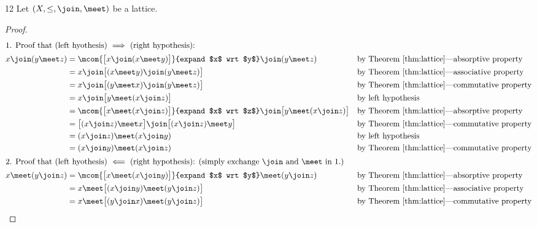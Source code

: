 \begin{theorem}
\label{thm:lat_dis}
\citep{burris}{12}
Let $(X,\le,\join,\meet)$ be a lattice.
\end{theorem}
\begin{proof}
\begin{align*}
\intertext{1. Proof that (left hyothesis) $\implies$   (right hypothesis):}
  x \join (y \meet z)
    &= \mcom{\big[ x \join (x\meet y)\big]}{expand $x$ wrt $y$} \join (y \meet z)
    && \text{by Theorem~\ref{thm:lattice}---absorptive property}
  \\&= x \join \big[ (x\meet y) \join (y \meet z) \big]
    && \text{by Theorem~\ref{thm:lattice}---associative property}
  \\&= x \join \big[ (y\meet x) \join (y \meet z) \big]
    && \text{by Theorem~\ref{thm:lattice}---commutative property}
  \\&= x \join \big[ y\meet(x \join z) \big]
    && \text{by left hypothesis}
  \\&= \mcom{\big[ x \meet (x \join z)\big]}{expand $x$ wrt $z$}  
       \join \big[ y\meet(x \join z) \big]
    && \text{by Theorem~\ref{thm:lattice}---absorptive property}
  \\&= \big[ (x \join z) \meet x\big] \join \big[ (x \join z) \meet y\big]
    && \text{by Theorem~\ref{thm:lattice}---commutative property}
  \\&= (x \join z) \meet (x \join y)
    && \text{by left hypothesis}
  \\&= (x \join y) \meet (x \join z)
    && \text{by Theorem~\ref{thm:lattice}---commutative property}
  \\
\intertext{2. Proof that (left hyothesis) $\impliedby$ (right hypothesis):
  (simply exchange $\join$ and $\meet$ in 1.)}
  x \meet (y \join z)
    &= \mcom{\big[ x \meet (x\join y)\big]}{expand $x$ wrt $y$} \meet (y \join z)
    && \text{by Theorem~\ref{thm:lattice}---absorptive property}
  \\&= x \meet \big[ (x\join y) \meet (y \join z) \big]
    && \text{by Theorem~\ref{thm:lattice}---associative property}
  \\&= x \meet \big[ (y\join x) \meet (y \join z) \big]
    && \text{by Theorem~\ref{thm:lattice}---commutative property}

\end{align*}
\end{proof}
